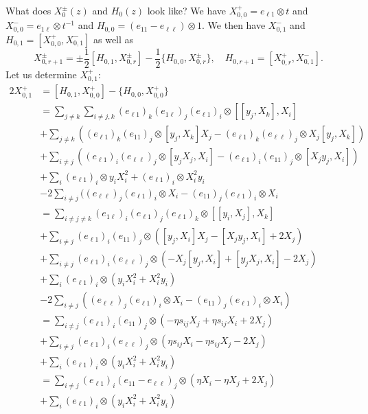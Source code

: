 \documentclass[11pt]{report}
\theoremstyle{definition}
\theoremstyle{remark}
\theoremstyle{remark}
\begin{document}
What does $X_0^\pm(z)$ and $H_0(z)$ look like? We have $X_{0,0}^+ = e_{\ell 1} \otimes t$ and $X_{0,0}^- = e_{1 \ell} \otimes t^{-1}$ and $H_{0,0} = (e_{11}-e_{\ell\ell}) \otimes 1$. We then have $X_{0,1}^-$ and $H_{0,1} = [X_{0,0}^+,X_{0,1}^-]$ as well as
\begin{equation*}
X_{0,r+1}^\pm = \pm \frac{1}{2} [H_{0,1},X_{0,r}^\pm] - \frac{1}{2} \{ H_{0,0}, X_{0,r}^\pm \}, \quad H_{0,r+1} = [X_{0,r}^+,X_{0,1}^-].
\end{equation*}
Let us determine $X_{0,1}^+$:
\begin{align*}
2 X_{0,1}^+
&= [H_{0,1},X_{0,0}^+]-\{ H_{0,0},X_{0,0}^+ \} \\
&= \sum_{j \neq k} \sum_{i \neq j,k} (e_{\ell 1})_k (e_{1 \ell})_j (e_{\ell 1})_i \otimes [[y_j,X_k],X_i] \\
&+ \sum_{j \neq k} ((e_{\ell 1})_k (e_{11})_j \otimes [y_j,X_k] X_j - (e_{\ell 1})_k (e_{\ell\ell})_j \otimes X_j [y_j,X_k]) \\
&+ \sum_{i \neq j}((e_{\ell 1})_i (e_{\ell\ell})_j \otimes [y_j X_j,X_i] - (e_{\ell 1})_i (e_{11})_j \otimes [X_j y_j,X_i]) \\
&+ \sum_i (e_{\ell 1})_i \otimes y_i X_i^2 + (e_{\ell 1})_i \otimes X_i^2 y_i \\
&- 2 \sum_{i \neq j} ((e_{\ell\ell})_j (e_{\ell 1})_i \otimes X_i - (e_{11})_j (e_{\ell 1})_i \otimes X_i \\
&= \sum_{i \neq j \neq k} (e_{1 \ell})_i (e_{\ell 1})_j (e_{\ell 1})_k \otimes [[y_i,X_j],X_k] \\
&+ \sum_{i \neq j} (e_{\ell 1})_i (e_{11})_j \otimes ([y_j,X_i] X_j - [X_j y_j,X_i] + 2X_j) \\
&+ \sum_{i \neq j} (e_{\ell 1})_i (e_{\ell\ell})_j \otimes (-X_j[y_j,X_i]+[y_j X_j,X_i] - 2X_j) \\
&+ \sum_i (e_{\ell 1})_i \otimes (y_i X_i^2 + X_i^2 y_i) \\
&- 2 \sum_{i \neq j} ((e_{\ell\ell})_j (e_{\ell 1})_i \otimes X_i - (e_{11})_j (e_{\ell 1})_i \otimes X_i) \\
&= \sum_{i \neq j} (e_{\ell 1})_i (e_{11})_j \otimes (-\eta s_{ij} X_j + \eta s_{ij} X_i + 2X_j) \\
&+ \sum_{i \neq j} (e_{\ell 1})_i (e_{\ell\ell})_j \otimes (\eta s_{ij} X_i - \eta s_{ij} X_j - 2X_j) \\
&+ \sum_i (e_{\ell 1})_i \otimes (y_i X_i^2 + X_i^2 y_i) \\
&= \sum_{i \neq j} (e_{\ell 1})_i (e_{11} - e_{\ell\ell})_j \otimes (\eta X_i - \eta X_j + 2X_j) \\
&+ \sum_i (e_{\ell 1})_i \otimes (y_i X_i^2 + X_i^2 y_i)
\end{align*}
\end{document}
